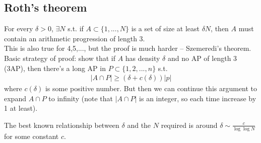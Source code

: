 \documentclass[a4paper]{article}
\begin{document}
\subsection{Roth's theorem}
\begin{thm}
    For every $\delta > 0$, $\exists N$ s.t. if $A \subset \{1,...,N\}$ is a set of size at least $\delta N$, then $A$ must contain an arithmetic progression of length 3.\\
    This is also true for 4,5,..., but the proof is much harder -- Szemeredi's theorem.\\
    Basic strategy of proof: show that if $A$ has density $\delta$ and no AP of length 3 (3AP), then there's a long AP in $P \subset \{1,2,...,n\}$ s.t.\begin{equation*}
        \begin{aligned}
            |A \cap P| \geq (\delta+c(\delta)) |p|
        \end{aligned}
    \end{equation*}
    where $c(\delta)$ is some positive number. But then we can continue this argument to expand $A\cap P$ to infinity (note that $|A\cap P|$ is an integer, so each time increase by 1 at least).

    The best known relationship between $\delta$ and the $N$ required is around $\delta \sim \frac{c}{\log\log N}$ for some constant $c$.
\end{thm}
\end{document}
